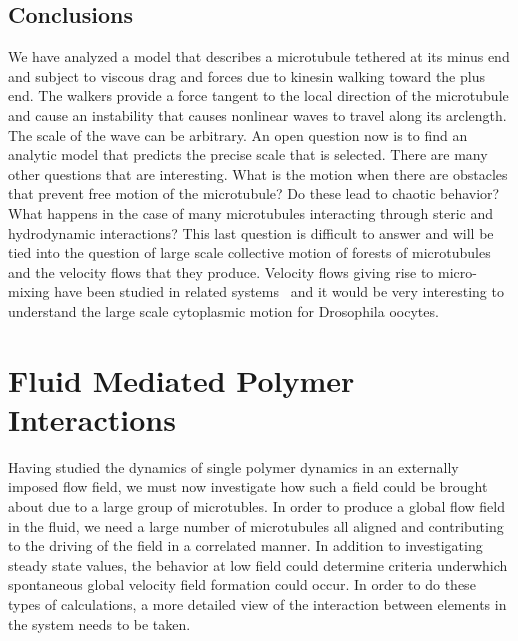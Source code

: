 \documentclass[11pt]{ucthesis}
\begin{document}
\section{Conclusions}

We have analyzed a model that describes a microtubule tethered at its minus
end and subject to viscous drag and forces due to kinesin walking toward the plus end. The walkers
provide a force tangent to the local direction of the microtubule and
cause an instability that causes nonlinear waves to travel along its
arclength. The scale of the wave can be arbitrary. An open question now 
is to find an analytic model that predicts the precise scale that
is selected. There are many other questions that are interesting.
What is the motion when there are obstacles that prevent free motion
of the microtubule? Do these lead to chaotic behavior? What happens
in the case of many microtubules interacting through steric and hydrodynamic
interactions? This last question is difficult to answer and will
be tied into the question of large scale collective motion of forests of
microtubules and the velocity flows that they produce. Velocity
flows giving rise to micro-mixing have been studied in related systems~\cite{GoldsteinTuvalvandeMeentPNAS,GoldsteinTuvalvandeMeentPRL,MeentSedermanGladdenGoldstein,VerchotLubiczGoldstein} and it would be very interesting to
understand the large scale cytoplasmic motion for Drosophila oocytes.







\chapter{Fluid Mediated Polymer Interactions}

Having studied the dynamics of single polymer dynamics in an externally imposed flow field, we must now investigate how such a field could be brought about due to a large group of microtubles. In order to produce a global flow field in the fluid, we need a large number of microtubules all aligned and contributing to the driving of the field in a correlated manner. 
In addition to investigating steady state values, the behavior at low field could determine criteria underwhich spontaneous global velocity field formation could occur. In order to do these types of calculations, a more detailed view of the interaction between elements in the system needs to be taken.
\end{document}
